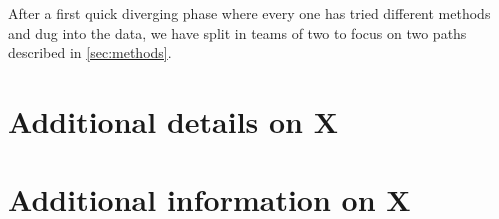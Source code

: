 \documentclass[11pt]{article}
\begin{document}
After a first quick diverging phase where every one has tried different methods and
dug into the data, we have split in teams of two to focus on two paths described in \cref{sec:methods}. 





\appendix

\newpage
\section{Additional details on X}
\label{app:sec:details}

\section{Additional information on X}
\end{document}
